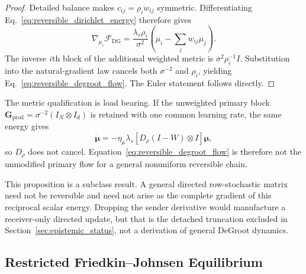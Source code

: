 \documentclass[12pt]{article}
\begin{document}
\begin{proof}
Detailed balance makes $c_{ij}=\rho_iw_{ij}$ symmetric.  Differentiating Eq.~\eqref{eq:reversible_dirichlet_energy} therefore gives
\begin{equation}
\nabla_{\mu_i}\mathcal F_{\mathrm{DG}}
=\frac{\lambda_s\rho_i}{\sigma^2}
\left(\mu_i-\sum_jw_{ij}\mu_j\right).
\end{equation}
The inverse $i$th block of the additional weighted metric is $\sigma^2\rho_i^{-1}I$.  Substitution into the natural-gradient law cancels both $\sigma^{-2}$ and $\rho_i$, yielding Eq.~\eqref{eq:reversible_degroot_flow}.  The Euler statement follows directly.
\end{proof}

The metric qualification is load bearing.  If the unweighted primary block $\mathbf G_{\mathrm{prod}}=\sigma^{-2}(I_N\otimes I_d)$ is retained with one common learning rate, the same energy gives
\begin{equation}
\dot{\boldsymbol\mu}
=-\eta_\mu\lambda_s[D_\rho(I-W)\otimes I]\boldsymbol\mu,
\label{eq:unweighted_reversible_flow}
\end{equation}
so $D_\rho$ does not cancel.  Equation~\eqref{eq:reversible_degroot_flow} is therefore not the unmodified primary flow for a general nonuniform reversible chain.

This proposition is a subclass result.  A general directed row-stochastic matrix need not be reversible and need not arise as the complete gradient of this reciprocal scalar energy.  Dropping the sender derivative would manufacture a receiver-only directed update, but that is the detached truncation excluded in Section~\ref{sec:epistemic_status}, not a derivation of general DeGroot dynamics.

\subsection{Restricted Friedkin--Johnsen Equilibrium}
\end{document}
